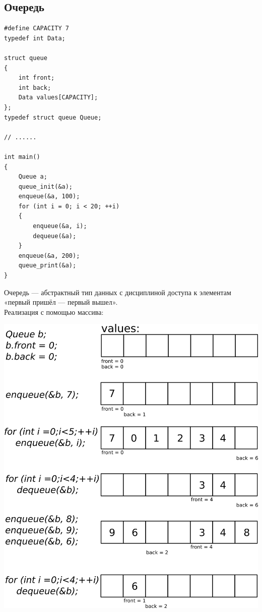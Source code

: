 \documentclass[10pt]{article}
\begin{document}
\subsection{Очередь}
\begin{multicols}{2}
\begin{lstlisting}
#define CAPACITY 7
typedef int Data;

struct queue
{
    int front;
    int back;
    Data values[CAPACITY];
};
typedef struct queue Queue;

// ......

int main()
{
    Queue a;
    queue_init(&a);
    enqueue(&a, 100);
    for (int i = 0; i < 20; ++i)
    {
        enqueue(&a, i);
        dequeue(&a);
    }
    enqueue(&a, 200);
    queue_print(&a);
}
\end{lstlisting}
\vfill\null
Очередь — абстрактный тип данных с дисциплиной доступа к элементам «первый пришёл — первый вышел». \\
Реализация с помощью массива:
\begin{center}
\includegraphics[width=1.05\linewidth]{../images/queue.png}
\end{center}
\end{multicols}
\end{document}
